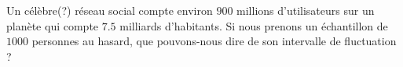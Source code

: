 
\begin{exercice}\label{exosmath-0333}

    Un célèbre(?) réseau social compte environ \( 900\) millions d'utilisateurs sur un planète qui compte \( 7.5\) milliards d'habitants. Si nous prenons un échantillon de \( 1000\) personnes au hasard, que pouvons-nous dire de son intervalle de fluctuation ?

\end{exercice}

